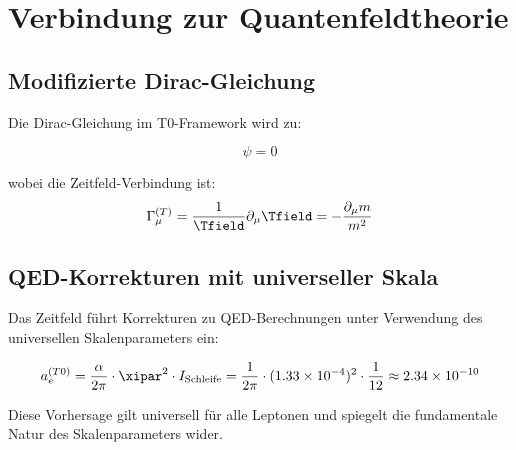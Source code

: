 	\section{Verbindung zur Quantenfeldtheorie}
	\label{sec:qft_verbindung}
	
	\subsection{Modifizierte Dirac-Gleichung}
	\label{subsec:modifizierte_dirac}
	
	Die Dirac-Gleichung im T0-Framework wird zu:
	
	\begin{equation}
		[i\gamma^{\mu}(\partial_{\mu} + \Gamma_{\mu}^{(T)}) - m(x,t)]\psi = 0
		\label{eq:t0_dirac}
	\end{equation}
	
	wobei die Zeitfeld-Verbindung ist:
	\begin{equation}
		\Gamma_{\mu}^{(T)} = \frac{1}{\Tfield} \partial_{\mu} \Tfield = -\frac{\partial_{\mu} m}{m^2}
		\label{eq:zeitfeld_verbindung}
	\end{equation}
	
	\subsection{QED-Korrekturen mit universeller Skala}
	\label{subsec:qed_korrekturen_universell}
	
	Das Zeitfeld führt Korrekturen zu QED-Berechnungen unter Verwendung des universellen Skalenparameters ein:
	
	\begin{equation}
		a_e^{(T0)} = \frac{\alpha}{2\pi} \cdot \xipar^2 \cdot I_{\text{Schleife}} = \frac{1}{2\pi} \cdot (1.33 \times 10^{-4})^2 \cdot \frac{1}{12} \approx 2.34 \times 10^{-10}
		\label{eq:anomales_moment_korrektur}
	\end{equation}
	
	Diese Vorhersage gilt universell für alle Leptonen und spiegelt die fundamentale Natur des Skalenparameters wider.
